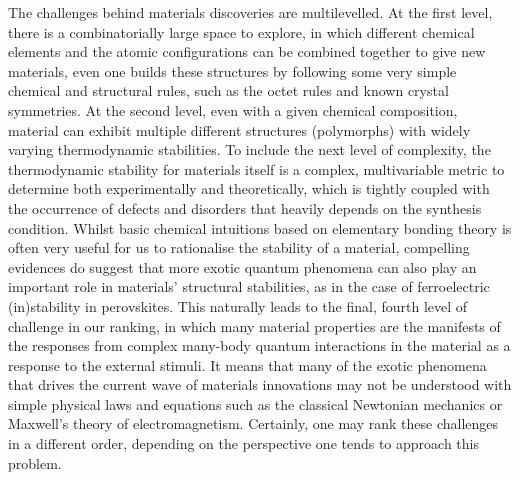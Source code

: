 The challenges behind materials discoveries are multilevelled. 
At the first level, there is a combinatorially large space to explore, in which different chemical elements and the atomic configurations can be combined together to give new materials,\cite{reymond2015chemical,groom2016cambridge,draxl2019nomad} even one builds these structures by following some very simple chemical and structural rules, such as the octet rules and known crystal symmetries.
At the second level, even with a given chemical composition, material can exhibit multiple different structures (polymorphs) with widely varying thermodynamic stabilities.\cite{doye1999evolution,engel2018mapping,senocrate2019thermochemical,yu2010polymorphism,bauer2001ritonavir} To include the next level of complexity, the thermodynamic  stability for materials itself is a complex, multivariable metric to determine both experimentally and theoretically, which is tightly coupled with the occurrence of defects and disorders that heavily depends on the synthesis condition. Whilst basic chemical intuitions based on elementary bonding theory is often very useful for us to rationalise the stability of a material, compelling evidences do suggest that more exotic quantum phenomena can also play an important role in materials' structural stabilities, as in the case of ferroelectric (in)stability in perovskites.\cite{bersuker2013pseudo} This naturally leads to the final, fourth level of challenge in our ranking, in which many material properties are the manifests of the responses from complex many-body quantum interactions in the material as a response to the external stimuli.\cite{slack1973nonmetallic,allen1993thermal,Migdal1958,Eliashberg1960,giustino2017electron,donchev2006many,ramasubramaniam2012large} It means that many of the exotic phenomena that drives the current wave of materials innovations may not be understood with simple physical laws and equations such as the classical Newtonian mechanics or Maxwell's theory of electromagnetism.
Certainly, one may rank these challenges in a different order, depending on the perspective one tends to approach this problem.

